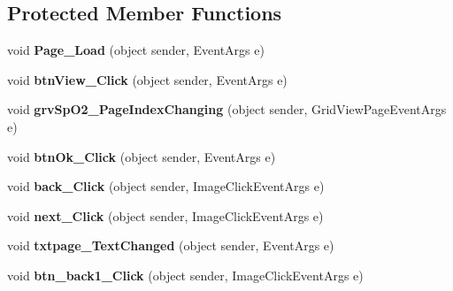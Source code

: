 \subsection*{Protected Member Functions}
\begin{DoxyCompactItemize}
\item 
\hypertarget{classusertrackothers__spo2_a149292b6e913839e0d118cdb6d5b558d}{void {\bfseries Page\-\_\-\-Load} (object sender, Event\-Args e)}\label{classusertrackothers__spo2_a149292b6e913839e0d118cdb6d5b558d}

\item 
\hypertarget{classusertrackothers__spo2_ac797d2fa02699e60553c438195daf391}{void {\bfseries btn\-View\-\_\-\-Click} (object sender, Event\-Args e)}\label{classusertrackothers__spo2_ac797d2fa02699e60553c438195daf391}

\item 
\hypertarget{classusertrackothers__spo2_a0efba08480fa61ac537ec6f9a4db19d7}{void {\bfseries grv\-Sp\-O2\-\_\-\-Page\-Index\-Changing} (object sender, Grid\-View\-Page\-Event\-Args e)}\label{classusertrackothers__spo2_a0efba08480fa61ac537ec6f9a4db19d7}

\item 
\hypertarget{classusertrackothers__spo2_a204ee51e25c47bfa1b4d9773dfd6ba09}{void {\bfseries btn\-Ok\-\_\-\-Click} (object sender, Event\-Args e)}\label{classusertrackothers__spo2_a204ee51e25c47bfa1b4d9773dfd6ba09}

\item 
\hypertarget{classusertrackothers__spo2_a9dfa0a4110fbe20b148ef427b7c441bf}{void {\bfseries back\-\_\-\-Click} (object sender, Image\-Click\-Event\-Args e)}\label{classusertrackothers__spo2_a9dfa0a4110fbe20b148ef427b7c441bf}

\item 
\hypertarget{classusertrackothers__spo2_a1eb766f86fb37a5b3bcae3aae794b304}{void {\bfseries next\-\_\-\-Click} (object sender, Image\-Click\-Event\-Args e)}\label{classusertrackothers__spo2_a1eb766f86fb37a5b3bcae3aae794b304}

\item 
\hypertarget{classusertrackothers__spo2_a1150f2f43c5ce844f0d1e1127af08076}{void {\bfseries txtpage\-\_\-\-Text\-Changed} (object sender, Event\-Args e)}\label{classusertrackothers__spo2_a1150f2f43c5ce844f0d1e1127af08076}

\item 
\hypertarget{classusertrackothers__spo2_a0a303d8335fd988df861a54c8243aacc}{void {\bfseries btn\-\_\-back1\-\_\-\-Click} (object sender, Image\-Click\-Event\-Args e)}\label{classusertrackothers__spo2_a0a303d8335fd988df861a54c8243aacc}


\end{DoxyCompactItemize}
